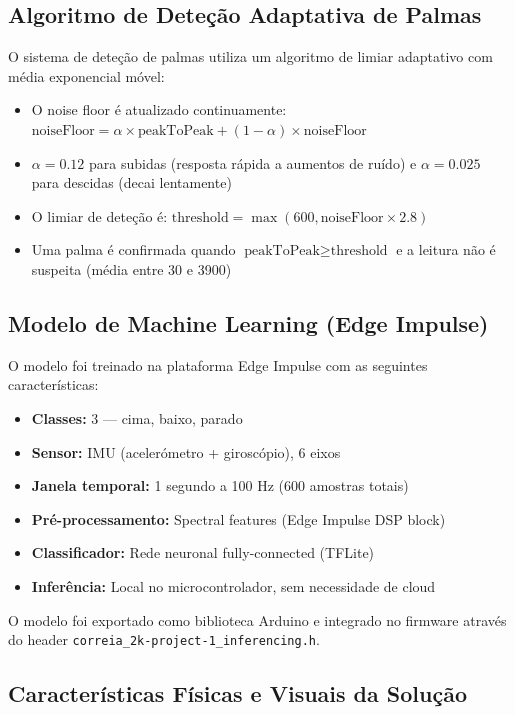 \documentclass[11pt, a4paper]{article}
\begin{document}
\subsection{Algoritmo de Deteção Adaptativa de Palmas}

O sistema de deteção de palmas utiliza um algoritmo de limiar adaptativo com média exponencial móvel:

\begin{itemize}
    \item O noise floor é atualizado continuamente: $\text{noiseFloor} = \alpha \times \text{peakToPeak} + (1 - \alpha) \times \text{noiseFloor}$
    \item $\alpha = 0.12$ para subidas (resposta rápida a aumentos de ruído) e $\alpha = 0.025$ para descidas (decai lentamente)
    \item O limiar de deteção é: $\text{threshold} = \max(600, \text{noiseFloor} \times 2.8)$
    \item Uma palma é confirmada quando $\text{peakToPeak} \geq \text{threshold}$ e a leitura não é suspeita (média entre 30 e 3900)
\end{itemize}

\subsection{Modelo de Machine Learning (Edge Impulse)}

O modelo foi treinado na plataforma Edge Impulse com as seguintes características:

\begin{itemize}
    \item \textbf{Classes:} 3 — cima, baixo, parado
    \item \textbf{Sensor:} IMU (acelerómetro + giroscópio), 6 eixos
    \item \textbf{Janela temporal:} 1 segundo a 100 Hz (600 amostras totais)
    \item \textbf{Pré-processamento:} Spectral features (Edge Impulse DSP block)
    \item \textbf{Classificador:} Rede neuronal fully-connected (TFLite)
    \item \textbf{Inferência:} Local no microcontrolador, sem necessidade de cloud
\end{itemize}

O modelo foi exportado como biblioteca Arduino e integrado no firmware através do header \texttt{correia\_2k-project-1\_inferencing.h}.

\subsection{Características Físicas e Visuais da Solução}
\end{document}
